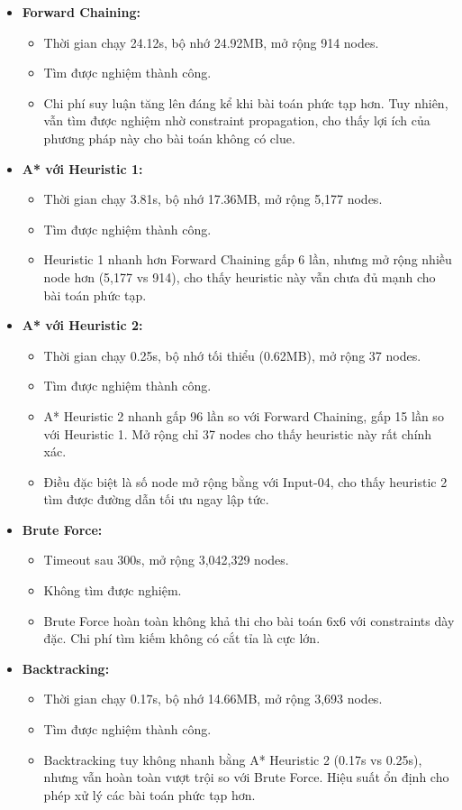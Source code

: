 \begin{itemize}
\item \textbf{Forward Chaining:}
\begin{itemize}
    \item Thời gian chạy 24.12s, bộ nhớ 24.92MB, mở rộng 914 nodes.
    \item Tìm được nghiệm thành công.
    \item Chi phí suy luận tăng lên đáng kể khi bài toán phức tạp hơn. Tuy nhiên, vẫn tìm được nghiệm nhờ constraint propagation, cho thấy lợi ích của phương pháp này cho bài toán không có clue.
\end{itemize}

\item \textbf{A* với Heuristic 1:}
\begin{itemize}
    \item Thời gian chạy 3.81s, bộ nhớ 17.36MB, mở rộng 5,177 nodes.
    \item Tìm được nghiệm thành công.
    \item Heuristic 1 nhanh hơn Forward Chaining gấp 6 lần, nhưng mở rộng nhiều node hơn (5,177 vs 914), cho thấy heuristic này vẫn chưa đủ mạnh cho bài toán phức tạp.
\end{itemize}

\item \textbf{A* với Heuristic 2:}
\begin{itemize}
    \item Thời gian chạy 0.25s, bộ nhớ tối thiểu (0.62MB), mở rộng 37 nodes.
    \item Tìm được nghiệm thành công.
    \item A* Heuristic 2 nhanh gấp 96 lần so với Forward Chaining, gấp 15 lần so với Heuristic 1. Mở rộng chỉ 37 nodes cho thấy heuristic này rất chính xác.
    \item Điều đặc biệt là số node mở rộng bằng với Input-04, cho thấy heuristic 2 tìm được đường dẫn tối ưu ngay lập tức.
\end{itemize}

\item \textbf{Brute Force:}
\begin{itemize}
    \item Timeout sau 300s, mở rộng 3,042,329 nodes.
    \item Không tìm được nghiệm.
    \item Brute Force hoàn toàn không khả thi cho bài toán 6x6 với constraints dày đặc. Chi phí tìm kiếm không có cắt tỉa là cực lớn.
\end{itemize}

\item \textbf{Backtracking:}
\begin{itemize}
    \item Thời gian chạy 0.17s, bộ nhớ 14.66MB, mở rộng 3,693 nodes.
    \item Tìm được nghiệm thành công.
    \item Backtracking tuy không nhanh bằng A* Heuristic 2 (0.17s vs 0.25s), nhưng vẫn hoàn toàn vượt trội so với Brute Force. Hiệu suất ổn định cho phép xử lý các bài toán phức tạp hơn.
\end{itemize}

\end{itemize}

